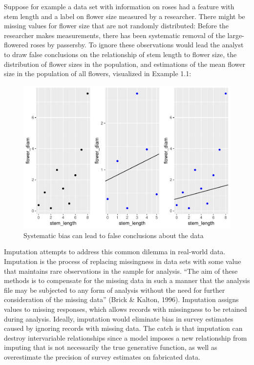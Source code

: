 \documentclass[12pt,twoside]{reedthesis}
\begin{document}
Suppose for example a data set with information on roses had a feature
with stem length and a label on flower size measured by a researcher.
There might be missing values for flower size that are not randomly
distributed: Before the researcher makes measurements, there has been
systematic removal of the large-flowered roses by passersby. To ignore
these observations would lead the analyst to draw false conclusions on
the relationship of stem length to flower size, the distribution of
flower sizes in the population, and estimations of the mean flower size
in the population of all flowers, visualized in Example 1.1:
\begin{figure}
\includegraphics[width=0.9\linewidth]{thesis_files/figure-latex/systematic-1} \caption{Systematic bias can lead to false conclusions about the data}\label{fig:systematic}
\end{figure}
Imputation attempts to address this common dilemma in real-world data.
Imputation is the process of replacing missingness in data sets with
some value that maintains rare observations in the sample for analysis.
``The aim of these methods is to compensate for the missing data in such
a manner that the analysis file may be subjected to any form of analysis
without the need for further consideration of the missing data'' (Brick
\& Kalton, 1996). Imputation assigns values to missing responses, which
allows records with missingness to be retained during analysis. Ideally,
imputation would eliminate bias in survey estimates caused by ignoring
records with missing data. The catch is that imputation can destroy
intervariable relationships since a model imposes a new relationship
from imputing that is not necessarily the true generative function, as
well as overestimate the precision of survey estimates on fabricated
data.
\end{document}
